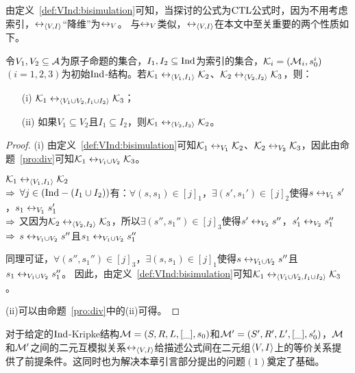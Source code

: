 由定义~\ref{def:VInd:bisimulation}可知，当探讨的公式为$\textrm{CTL}$公式时，因为不用考虑索引，$\leftrightarrow_{{\langle{V, I}\rangle}}$“降维”为$\leftrightarrow_V$。
与$\leftrightarrow_V$类似，$\leftrightarrow_{{\langle{V, I}\rangle}}$在本文中至关重要的两个性质如下。
\begin{proposition}\label{pro:VI:div}
	令$V_1,V_2\subseteq {\cal A}$为原子命题的集合，$I_1, I_2 \subseteq \textrm{Ind}$为索引的集合，${\cal K}_i = ({\cal M}_i, s_0^i)$ $(i=1,2,3)$为初始$\textrm{Ind}$-结构。若${\cal K}_1 \leftrightarrow_{{\langle{V_1,I_1}\rangle}} {\cal K}_2$、${\cal K}_2 \leftrightarrow_{{\langle{V_2,I_2}\rangle}} {\cal K}_3$，则：
	\begin{itemize}
		\item[(i)] ${\cal K}_1 \leftrightarrow_{{\langle{V_1\cup V_2,I_1\cup I_2}\rangle}} {\cal K}_3$；
		\item[(ii)] 如果$V_1 \subseteq V_2$且$I_1 \subseteq I_2$，则${\cal K}_1 \leftrightarrow_{{\langle{V_2,I_2}\rangle}} {\cal K}_2$。
	\end{itemize}
\end{proposition}
\begin{proof}
	(i) 由定义~\ref{def:VInd:bisimulation}可知${\cal K}_1 \leftrightarrow_{V_1} {\cal K}_2$、${\cal K}_2 \leftrightarrow_{V_2} {\cal K}_3$，因此由命题~\ref{pro:div}可知${\cal K}_1 \leftrightarrow_{V_1\cup V_2} {\cal K}_3$。
	
	${\cal K}_1 \leftrightarrow_{{\langle{V_1,I_1}\rangle}} {\cal K}_2$\\
	$\Rightarrow$ $\forall j\in (\textrm{Ind}-(I_1\cup I_2))$有：$\forall(s,s_1) \in [j]_1$，$\exists (s', s_1')\in [j]_2$使得$s\leftrightarrow_{V_1} s'$，$s_1\leftrightarrow_{V_1} s_1'$\\
	$\Rightarrow$ 又因为${\cal K}_2 \leftrightarrow_{{\langle{V_2,I_2}\rangle}} {\cal K}_3$，所以$\exists (s'', s_1'')\in [j]_3$使得$s'\leftrightarrow_{V_2} s''$，$s_1'\leftrightarrow_{V_2} s_1''$  \hfill \\
	$\Rightarrow$ $s \leftrightarrow_{V_1\cup V_2} s''$且$s_1 \leftrightarrow_{V_1\cup V_2} s_1''$
	
	同理可证，$\forall (s'',s_1'')\in [j]_3$，$\exists (s,s_1)\in [j]_1$使得$s \leftrightarrow_{V_1\cup V_2} s''$且$s_1 \leftrightarrow_{V_1\cup V_2} s_1''$。
	因此，由定义~\ref{def:VInd:bisimulation}可知${\cal K}_1 \leftrightarrow_{{\langle{V_1\cup V_2,I_1\cup I_2}\rangle}} {\cal K}_3$。
	
	(ii)可以由命题~\ref{pro:div}中的(ii)可得。
\end{proof}

对于给定的$\textrm{Ind}$-Kripke结构${\cal M}=(S,R,L,[\_],s_0)$和${\cal M}'=(S',R',L',[\_],s_0')$，${\cal M}$和${\cal M}'$之间的二元互模拟关系$\leftrightarrow_{{\langle{V,I}\rangle}}$给描述公式间在二元组${\langle{V,I}\rangle}$上的等价关系提供了前提条件。这同时也为解决本章引言部分提出的问题$(1)$奠定了基础。

